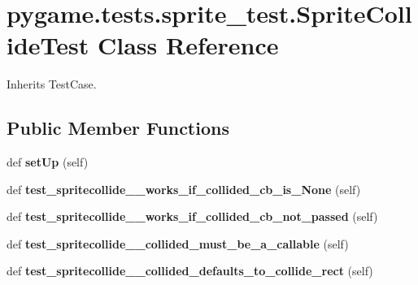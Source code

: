 \hypertarget{classpygame_1_1tests_1_1sprite__test_1_1_sprite_collide_test}{}\section{pygame.\+tests.\+sprite\+\_\+test.\+Sprite\+Collide\+Test Class Reference}
\label{classpygame_1_1tests_1_1sprite__test_1_1_sprite_collide_test}


Inherits Test\+Case.

\subsection*{Public Member Functions}
\begin{DoxyCompactItemize}
\item 
\mbox{\label{classpygame_1_1tests_1_1sprite__test_1_1_sprite_collide_test_a3161c1f182048d1117df792dc73961e2}} 
def {\bfseries set\+Up} (self)
\item 
\mbox{\label{classpygame_1_1tests_1_1sprite__test_1_1_sprite_collide_test_ac1844487df7a90a2325e5a4c5e37e785}} 
def {\bfseries test\+\_\+spritecollide\+\_\+\+\_\+works\+\_\+if\+\_\+collided\+\_\+cb\+\_\+is\+\_\+\+None} (self)
\item 
\mbox{\label{classpygame_1_1tests_1_1sprite__test_1_1_sprite_collide_test_abde9d20934cafbf9400834ee51ba1125}} 
def {\bfseries test\+\_\+spritecollide\+\_\+\+\_\+works\+\_\+if\+\_\+collided\+\_\+cb\+\_\+not\+\_\+passed} (self)
\item 
\mbox{\label{classpygame_1_1tests_1_1sprite__test_1_1_sprite_collide_test_a0b355c140d96ea9137ae5ee603a905ee}} 
def {\bfseries test\+\_\+spritecollide\+\_\+\+\_\+collided\+\_\+must\+\_\+be\+\_\+a\+\_\+callable} (self)
\item 
\mbox{\label{classpygame_1_1tests_1_1sprite__test_1_1_sprite_collide_test_add611e2ce61610507cf2beca368e0110}} 
def {\bfseries test\+\_\+spritecollide\+\_\+\+\_\+collided\+\_\+defaults\+\_\+to\+\_\+collide\+\_\+rect} (self)

\end{DoxyCompactItemize}
